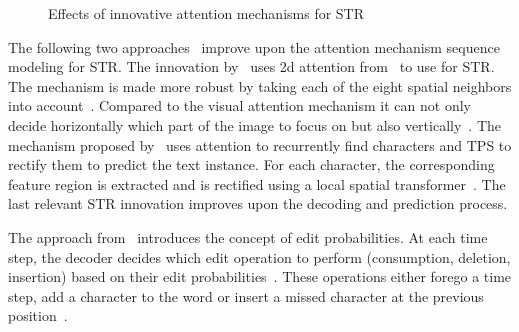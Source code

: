 \begin{figure}[ht]
    \centering\scriptsize
    \caption{%
        Effects of innovative attention mechanisms for STR\label{fig:attention-examples}
    }
\end{figure}
The following two approaches~\citep{li_show_2019,liu_char-net_2018} improve upon the attention
mechanism sequence modeling for \ac{STR}.
The innovation by~\cite{li_show_2019} uses 2d attention from~\citep{xu_show_2016} to use
for \ac{STR}.
The mechanism is made more robust by taking each of the eight spatial neighbors into
account~\citep{li_show_2019}.
Compared to the visual attention mechanism it can not only decide horizontally which part of the
image to focus on but also vertically~\citep{li_show_2019,ghosh_visual_2017}.
The mechanism proposed by~\cite{liu_char-net_2018} uses attention to recurrently find characters and
\ac{TPS} to rectify them to predict the text instance.
For each character, the corresponding feature region is extracted and is
rectified using a local spatial transformer~\citep{liu_char-net_2018}.
The last relevant \ac{STR} innovation improves upon the decoding and prediction process.

The approach from~\cite{bai_edit_2018} introduces the concept of edit probabilities.
At each time step, the decoder decides which edit operation to perform (consumption, deletion,
insertion) based on their edit probabilities~\citep{bai_edit_2018}.
These operations either forego a time step, add a character to the word or insert a missed character
at the previous position~\citep{bai_edit_2018}.

